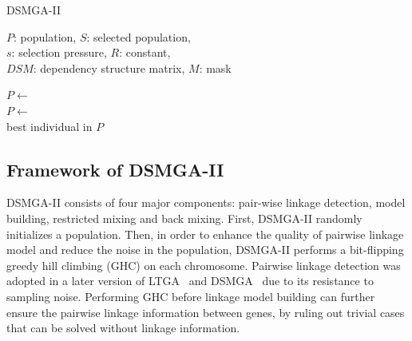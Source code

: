 \begin{algorithm}
\caption{DSMGA-II}\label{algo_disjdecomp}


$P$: population, $S$: selected population, \\
$s$: selection pressure, $R$: constant, \\
$DSM$: dependency structure matrix, $M$: mask \\


\BlankLine

$P \leftarrow$  \\
$P \leftarrow$  \\
\Return best individual in $P$
\end{algorithm}


\subsection{Framework of DSMGA-II}
DSMGA-II consists of four major components: pair-wise linkage detection, model building, restricted mixing and back mixing. 
First, DSMGA-II randomly initializes a population. 
Then, in order to enhance the quality of pairwise linkage model and reduce the noise in the population, DSMGA-II performs a bit-flipping greedy hill climbing (GHC) on each chromosome. 
Pairwise linkage detection was adopted in a later version of LTGA~\cite{pelikan:pairwise} and DSMGA~\cite{yu:DSMGA} due to its resistance to sampling noise. 
Performing GHC before linkage model building can further ensure the pairwise linkage information between genes, by ruling out trivial cases that can be solved without linkage information. 

